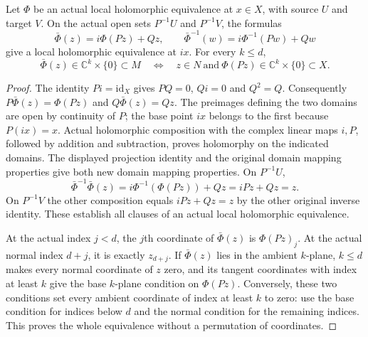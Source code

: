 \begin{lemma}
\label{hir:actual-zero-section-product-flattening}
\leanok
Let $\Phi$ be an actual local holomorphic equivalence at $x\in X$,
with source $U$ and target $V$. On the actual open sets $P^{-1}U$ and
$P^{-1}V$, the formulas
\[
 \bar\Phi(z)=i\Phi(Pz)+Qz,\qquad
 \bar\Phi^{-1}(w)=i\Phi^{-1}(Pw)+Qw
\]
give a local holomorphic equivalence at $ix$. For every $k\leq d$,
\[
 \bar\Phi(z)\in\mathbb C^k\times\{0\}\subset M
 \quad\Longleftrightarrow\quad
 z\in N\ \text{and}\ \Phi(Pz)\in\mathbb C^k\times\{0\}\subset X.
\]
\end{lemma}
\begin{proof}
The identity $Pi=\mathrm{id}_X$ gives $PQ=0$, $Qi=0$ and $Q^2=Q$.
Consequently $P\bar\Phi(z)=\Phi(Pz)$ and $Q\bar\Phi(z)=Qz$.
The preimages defining the two domains are open by continuity of $P$;
the base point $ix$ belongs to the first because $P(ix)=x$. Actual
holomorphic composition with the complex linear maps $i,P$, followed by
addition and subtraction, proves holomorphy on the indicated domains.
The displayed projection identity and the original domain mapping
properties give both new domain mapping properties. On $P^{-1}U$,
\[
 \bar\Phi^{-1}\bar\Phi(z)
 =i\Phi^{-1}(\Phi(Pz))+Qz=iPz+Qz=z.
\]
On $P^{-1}V$ the other composition equals $iPz+Qz=z$ by the other
original inverse identity. These establish all clauses of an actual
local holomorphic equivalence.

At the actual index $j<d$, the $j$th coordinate of $\bar\Phi(z)$ is
$\Phi(Pz)_j$. At the actual normal index $d+j$, it is exactly $z_{d+j}$.
If $\bar\Phi(z)$ lies in the ambient $k$-plane, $k\leq d$ makes every
normal coordinate of $z$ zero, and its tangent coordinates with index
at least $k$ give the base $k$-plane condition on $\Phi(Pz)$.
Conversely, these two conditions set every ambient coordinate of index
at least $k$ to zero: use the base condition for indices below $d$ and
the normal condition for the remaining indices. This proves the whole
equivalence without a permutation of coordinates.
\end{proof}

